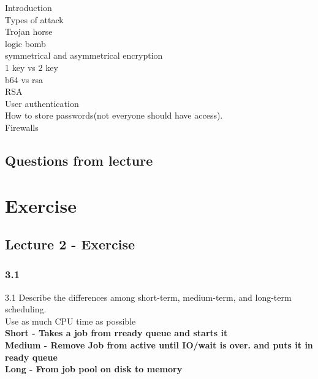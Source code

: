 \documentclass[a4paper,10pt,titlepage]{report}
\begin{document}
Introduction \\
Types of attack \\
	Trojan horse \\
	logic bomb \\

symmetrical and asymmetrical encryption \\
	1 key vs 2 key\\
	b64 vs rsa \\
	RSA \\

User authentication \\
	How to store passwords(not everyone should have access). \\
	Firewalls \\
	

\subsection{Questions from lecture}

























\newpage
\section{Exercise}
\subsection{Lecture 2 - Exercise}
\subsubsection{3.1}
3.1 Describe the differences among short-term, medium-term, and long-term scheduling.\\
Use as much CPU time as possible \\
\textbf{Short - Takes a job from rready queue and starts it}\\
\textbf{Medium - Remove Job from active until IO/wait is over. and puts it in ready queue}\\
\textbf{Long - From job pool on disk to memory }\\ \vspace{5mm}
\end{document}
